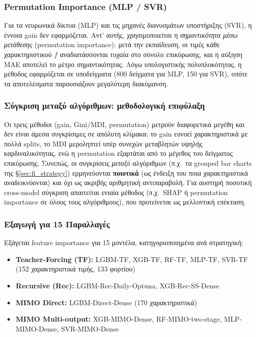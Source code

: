 \subsubsection*{Permutation Importance (MLP / SVR)}

Για τα νευρωνικά δίκτυα (MLP) και τις μηχανές διανυσμάτων υποστήριξης (SVR),
η έννοια gain δεν εφαρμόζεται. Αντ' αυτής, χρησιμοποιείται η
\textit{σημαντικότητα μέσω μετάθεσης} (permutation importance): μετά την
εκπαίδευση, οι τιμές κάθε χαρακτηριστικού \(f\) αναδιατάσσονται τυχαία στο
σύνολο επικύρωσης, και η αύξηση MAE αποτελεί το μέτρο σημαντικότητας. Λόγω
υπολογιστικής πολυπλοκότητας, η μέθοδος εφαρμόζεται σε υποδείγματα (800 δείγματα
για MLP, 150 για SVR), οπότε τα αποτελέσματα παρουσιάζουν μεγαλύτερη διακύμανση.

\subsubsection*{Σύγκριση μεταξύ αλγόριθμων: μεθοδολογική επιφύλαξη}

Οι τρεις μέθοδοι (gain, Gini/MDI, permutation) μετρούν διαφορετικά μεγέθη και δεν
είναι άμεσα συγκρίσιμες σε απόλυτη κλίμακα: το gain ευνοεί χαρακτηριστικά με πολλά
splits, το MDI μεροληπτεί υπέρ συνεχών μεταβλητών υψηλής καρδιναλικότητας, ενώ η
permutation εξαρτάται από το μέγεθος του δείγματος επικύρωσης. Συνεπώς, οι
συγκρίσεις \emph{μεταξύ} αλγόριθμων (π.χ.\ τα grouped bar charts της
§\ref{sec:fi_strategy}) ερμηνεύονται \textbf{ποιοτικά} (ως ένδειξη του ποια
χαρακτηριστικά αναδεικνύονται) και όχι ως ακριβής αριθμητική αντιπαραβολή. Για
αυστηρή ποσοτική cross-model σύγκριση απαιτείται ενιαία μέθοδος (π.χ.\ SHAP ή
permutation importance σε όλους τους αλγόριθμους), που προτείνεται ως μελλοντική
επέκταση.

\subsubsection*{Εξαγωγή για 15 Παραλλαγές}

Εξάγεται feature importance για 15 μοντέλα, κατηγοριοποιημένα ανά στρατηγική:
\begin{itemize}
    \item \textbf{Teacher-Forcing (TF):} LGBM-TF, XGB-TF, RF-TF, MLP-TF, SVR-TF
    (152 χαρακτηριστικά τιμής, 133 φορτίου)
    \item \textbf{Recursive (Rec):} LGBM-Rec-Daily-Optuna, XGB-Rec-SS-Dense
    \item \textbf{MIMO Direct:} LGBM-Direct-Dense (170 χαρακτηριστικά)
    \item \textbf{MIMO Multi-output:} XGB-MIMO-Dense, RF-MIMO-two-stage,
    MLP-MIMO-Dense, SVR-MIMO-Dense
\end{itemize}

